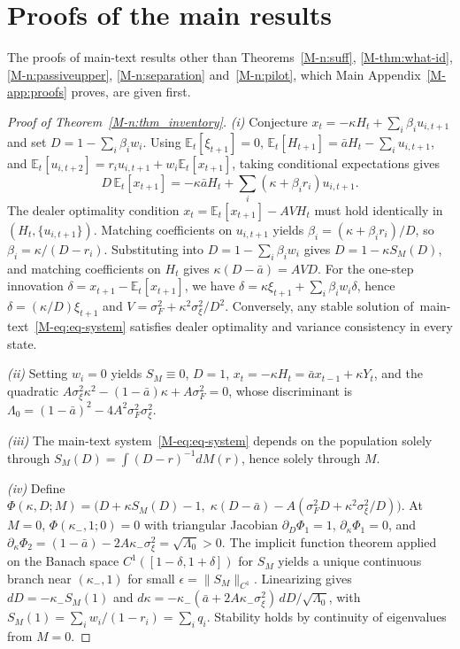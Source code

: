 \documentclass[12pt]{article}
\theoremstyle{definition}
\theoremstyle{remark}
\newcommand{\E}{\mathbb{E}}
\begin{document}
\section{Proofs of the main results}\label{app:proofs}

\noindent The proofs of main-text results other than Theorems~\ref{M-n:suff}, \ref{M-thm:what-id}, \ref{M-n:passiveupper}, \ref{M-n:separation} and~\ref{M-n:pilot}, which Main Appendix~\ref{M-app:proofs} proves, are given first.

\begin{proof}[Proof of Theorem~\ref{M-n:thm_inventory}]
\emph{(i)} Conjecture $x_t = -\kappa H_t + \sum_i \beta_i u_{i,t+1}$ and set $D = 1 - \sum_i \beta_i w_i$. Using $\E_t[\xi_{t+1}] = 0$, $\E_t[H_{t+1}] = \bar{a} H_t - \sum_i u_{i,t+1}$, and $\E_t[u_{i,t+2}] = r_i u_{i,t+1} + w_i \E_t[x_{t+1}]$, taking conditional expectations gives
\[
  D\, \E_t[x_{t+1}] = -\kappa \bar{a} H_t + \sum_i (\kappa + \beta_i r_i) u_{i,t+1}.
\]
The dealer optimality condition $x_t = \E_t[x_{t+1}] - A V H_t$ must hold identically in $(H_t, \{u_{i,t+1}\})$. Matching coefficients on $u_{i,t+1}$ yields $\beta_i = (\kappa + \beta_i r_i)/D$, so $\beta_i = \kappa / (D - r_i)$. Substituting into $D = 1 - \sum_i \beta_i w_i$ gives $D = 1 - \kappa S_M(D)$, and matching coefficients on $H_t$ gives $\kappa(D - \bar{a}) = A V D$. For the one-step innovation $\delta = x_{t+1} - \E_t[x_{t+1}]$, we have $\delta = \kappa \xi_{t+1} + \sum_i \beta_i w_i \delta$, hence $\delta = (\kappa/D)\xi_{t+1}$ and $V = \sigma_F^2 + \kappa^2 \sigma_\xi^2 / D^2$. Conversely, any stable solution of~main-text~\eqref{M-eq:eq-system} satisfies dealer optimality and variance consistency in every state.

\emph{(ii)} Setting $w_i = 0$ yields $S_M \equiv 0$, $D = 1$, $x_t = -\kappa H_t = \bar{a} x_{t-1} + \kappa Y_t$, and the quadratic $A \sigma_\xi^2 \kappa^2 - (1 - \bar{a})\kappa + A \sigma_F^2 = 0$, whose discriminant is $\Lambda_0 = (1 - \bar{a})^2 - 4 A^2 \sigma_F^2 \sigma_\xi^2$.

\emph{(iii)} The main-text system~\eqref{M-eq:eq-system} depends on the population solely through $S_M(D) = \int (D - r)^{-1} dM(r)$, hence solely through $M$.

\emph{(iv)} Define $\Phi(\kappa, D; M) = \bigl(D + \kappa S_M(D) - 1,\; \kappa(D - \bar{a}) - A(\sigma_F^2 D + \kappa^2 \sigma_\xi^2 / D)\bigr)$. At $M = 0$, $\Phi(\kappa_-, 1; 0) = 0$ with triangular Jacobian $\partial_D \Phi_1 = 1$, $\partial_\kappa \Phi_1 = 0$, and $\partial_\kappa \Phi_2 = (1 - \bar{a}) - 2 A \kappa_- \sigma_\xi^2 = \sqrt{\Lambda_0} > 0$. The implicit function theorem applied on the Banach space $C^1([1-\delta, 1+\delta])$ for $S_M$ yields a unique continuous branch near $(\kappa_-, 1)$ for small $\epsilon = \|S_M\|_{C^1}$. Linearizing gives $dD = -\kappa_- S_M(1)$ and $d\kappa = -\kappa_-(\bar{a} + 2 A \kappa_- \sigma_\xi^2)\, dD / \sqrt{\Lambda_0}$, with $S_M(1) = \sum_i w_i/(1 - r_i) = \sum_i q_i$. Stability holds by continuity of eigenvalues from $M = 0$.
\end{proof}
\end{document}

